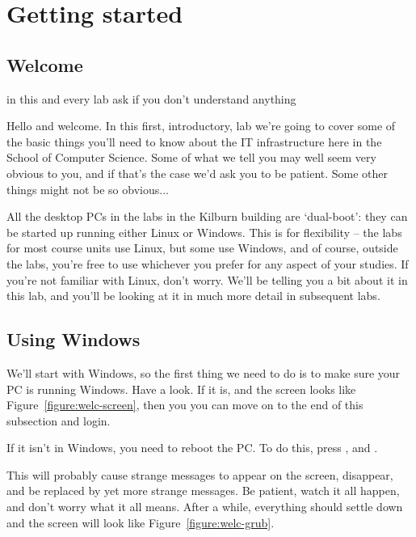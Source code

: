 \setcounter{chapter}{-1}
\newcommand{\splunge}{\textcolor{red}{\bf SPLUNGE}}

\chapter{Getting started}
\label{cha:getting-started}

\minitoc

\section{Welcome}

\begin{note}
in this and every lab ask if you don't understand anything
\end{note}

Hello and welcome. In this first, introductory, lab we're going to
cover some of the basic things you'll need to know about the IT
infrastructure here in the School of Computer Science. Some of what we
tell you may well seem very obvious to you, and if that's the case
we'd ask you to be patient. Some other things might not be so obvious...

All the desktop PCs in the labs in the Kilburn building are
`dual-boot': they can be started up running either Linux or
Windows. This is for flexibility -- the labs for most course units  use
Linux, but some use Windows, and of course, outside the labs, you're free to use
whichever you prefer for any aspect of your studies. If you're not
familiar with Linux, don't worry. We'll be telling you a bit about it
in this lab, and you'll be looking at it in much more detail in subsequent labs.

\section{Using Windows}
\label{sec:using-windows}

We'll start with Windows, so the first thing we need to do is to make
sure your PC is running Windows. Have a look. If it is, 
and the screen looks like Figure~\ref{figure:welc-screen}, then you  you can move on to the end of this subsection and login.

If it isn't in Windows, you need to reboot the PC. To do
this, press ,  and .

This will probably cause strange messages to appear on the screen,
disappear, and be replaced by yet more strange messages. Be patient,
watch it all happen, and don't worry what it all means. After a while,
everything should settle down and the screen will look like
Figure~\ref{figure:welc-grub}.

